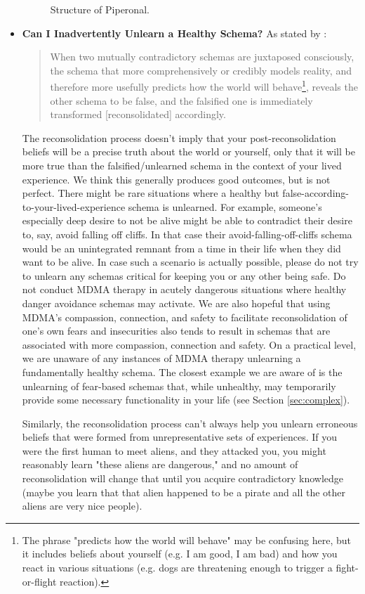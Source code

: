 \documentclass[12pt,letterpaper]{book}
\begin{document}
\begin{itemize}
        \begin{figure}[htbp]
            \centering
            \caption{Structure of Piperonal.}
            \label{fig:piperonal}
        \end{figure}
        \FloatBarrier
    \item \textbf{Can I Inadvertently Unlearn a Healthy Schema?}
        \label{unlearnHealthy}
        As stated by \textcite{ecker2015misunderstood}:
        \begin{quotation}
         When two mutually contradictory schemas are juxtaposed consciously, the schema that more comprehensively or credibly models reality, and therefore more usefully predicts how the world will behave\footnote{The phrase "predicts how the world will behave" may be confusing here, but it includes beliefs about yourself (e.g. I am good, I am bad) and how you react in various situations (e.g. dogs are threatening enough to trigger a fight-or-flight reaction).}, reveals the other schema to be false, and the falsified one is immediately transformed [reconsolidated] accordingly.
        \end{quotation}
        The reconsolidation process doesn't imply that your post-reconsolidation beliefs will be a precise truth about the world or yourself, only that it will be more true than the falsified/unlearned schema in the context of your lived experience. We think this generally produces good outcomes, but is not perfect. There might be rare situations where a healthy but false-according-to-your-lived-experience schema is unlearned. For example, someone's especially deep desire to not be alive might be able to contradict their desire to, say, avoid falling off cliffs. In that case their avoid-falling-off-cliffs schema would be an unintegrated remnant from a time in their life when they did want to be alive. In case such a scenario is actually possible, please do not try to unlearn any schemas critical for keeping you or any other being safe. Do not conduct MDMA therapy in acutely dangerous situations where healthy danger avoidance schemas may activate. We are also hopeful that using MDMA's compassion, connection, and safety to facilitate reconsolidation of one's own fears and insecurities also tends to result in schemas that are associated with more compassion, connection and safety. On a practical level, we are unaware of any instances of MDMA therapy unlearning a fundamentally healthy schema. The closest example we are aware of is the unlearning of fear-based schemas that, while unhealthy, may temporarily provide some necessary functionality in your life (see Section \ref{sec:complex}).
        
        Similarly, the reconsolidation process can't always help you unlearn erroneous beliefs that were formed from unrepresentative sets of experiences. If you were the first human to meet aliens, and they attacked you, you might reasonably learn "these aliens are dangerous," and no amount of reconsolidation will change that until you acquire contradictory knowledge (maybe you learn that that alien happened to be a pirate and all the other aliens are very nice people).
\end{itemize}
\end{document}
